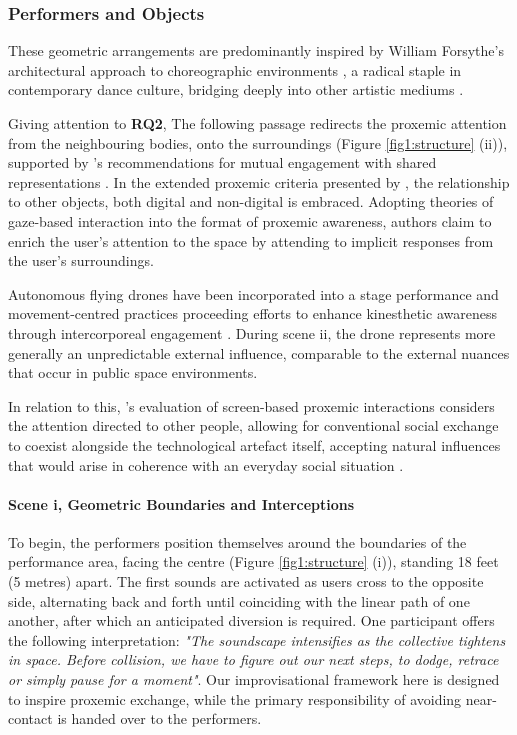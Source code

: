 \subsubsection{Performers and Objects}
\label{sec:structure_2}

These geometric arrangements are predominantly inspired by William Forsythe's architectural approach to choreographic environments \citep{forsythe_dance_1999}, a radical staple in contemporary dance culture, bridging deeply into other artistic mediums \citep{clark_geometry_2014}.

Giving attention to \textbf{RQ2}, The following passage redirects the proxemic attention from the neighbouring bodies, onto the surroundings (Figure \ref{fig1:structure} (ii)), supported by \citeauthor{bryan-kinns_mutual_2013}'s recommendations for mutual engagement with shared representations \cite{bryan-kinns_mutual_2013}. In the extended proxemic criteria presented by \cite{ballendat_proxemic_2010}, the relationship to other objects, both digital and non-digital is embraced. Adopting theories of gaze-based interaction into the format of proxemic awareness, authors claim to enrich the user's attention to the space by attending to implicit responses from the user's surroundings.

Autonomous flying drones have been incorporated into a stage performance \citep{eriksson_dancing_2019} and movement-centred practices \citep{la_delfa_drone_2020} proceeding efforts to enhance kinesthetic awareness through intercorporeal engagement \citep{tezza_state---art_2019}. During scene ii, the drone represents more generally an unpredictable external influence, comparable to the external nuances that occur in public space environments.

In relation to this, \citeauthor{ballendat_proxemic_2010}'s evaluation of screen-based proxemic interactions considers the attention directed to other people, allowing for conventional social exchange to coexist alongside the technological artefact itself, accepting natural influences that would arise in coherence with an everyday social situation \cite{ballendat_proxemic_2010}.

\paragraph{Scene i, Geometric Boundaries and Interceptions}

To begin, the performers position themselves around the boundaries of the performance area, facing the centre (Figure \ref{fig1:structure} (i)), standing 18 feet (5 metres) apart. The first sounds are activated as users cross to the opposite side, alternating back and forth until coinciding with the linear path of one another, after which an anticipated diversion is required. One participant offers the following interpretation: \textit{"The soundscape intensifies as the collective tightens in space. Before collision, we have to figure out our next steps, to dodge, retrace or simply pause for a moment"}. Our improvisational framework here is designed to inspire proxemic exchange, while the primary responsibility of avoiding near-contact is handed over to the performers.

